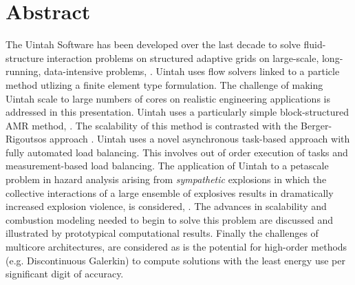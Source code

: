 \section*{Abstract}
%

The Uintah Software has been developed over the last decade 
\cite{csafe2,csafe3} to 
solve fluid-structure interaction problems on structured
adaptive grids on large-scale, long-running, data-intensive
problems, \cite{fourthmit}. Uintah uses flow solvers linked to
a particle method utlizing a finite element type formulation.
The challenge of making Uintah scale to large numbers of cores
on realistic engineering applications is addressed in this presentation.
Uintah uses a particularly simple block-structured AMR method, \cite{IPDPS10}. The scalability
of this method is contrasted with the Berger-Rigoutsos approach \cite{BergerRigoutsos}. 
Uintah uses a novel asynchronous task-based approach with
fully automated load balancing. This involves out of order execution of tasks \cite{Meng}  and measurement-based
load balancing. The application of Uintah to a petascale problem
in hazard analysis arising from {\it sympathetic} explosions in which the
collective interactions of a large ensemble of explosives results in
dramatically increased explosion violence, is considered, \cite{Ber2010b}. 
The advances in scalability and combustion
modeling needed to begin to solve this problem are discussed and illustrated by prototypical
computational results. Finally the challenges of multicore
architectures, are considered as is the potential for  
high-order methods (e.g. Discontinuous Galerkin) to compute solutions with the least 
energy use per significant digit of accuracy. 

